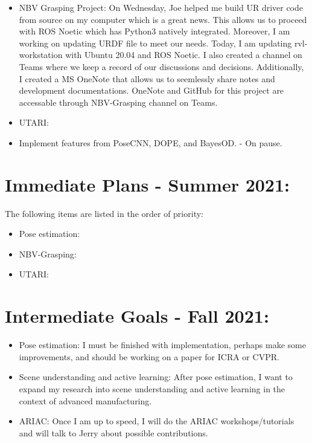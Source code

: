 \documentclass[11pt]{article}
\begin{document}
\begin{itemize}
      \item NBV Grasping Project: On Wednesday, Joe helped me build UR driver
      code from source on my computer which is a great news. This allows us to
      proceed with ROS Noetic which has Python3 natively integrated. Moreover,
      I am working on updating URDF file to meet our needs. Today, I am updating
      rvl-workstation with Ubuntu 20.04 and ROS Noetic. I also created a channel
      on Teams where we keep a record of our discussions and decisions. Additionally,
      I created a MS OneNote that allows us to seemlessly share notes and development
      documentations. OneNote and GitHub for this project are accessable through
      NBV-Grasping channel on Teams.

      \item UTARI:

      \item Implement features from PoseCNN, DOPE, and BayesOD. - On pause.
\end{itemize}


\section{Immediate Plans - Summer 2021:}
The following items are listed in the order of priority:

\begin{itemize}
      \item Pose estimation:
      \item NBV-Grasping:
      \item UTARI:
\end{itemize}

\section{Intermediate Goals - Fall 2021:}
\begin{itemize}
      \item Pose estimation: I must be finished with implementation, perhaps
      make some improvements, and should be working on a paper for ICRA or CVPR.
      \item Scene understanding and active learning: After pose estimation, I
      want to expand my research into scene understanding and active learning in
      the context of advanced manufacturing.
      \item ARIAC: Once I am up to speed, I will do the ARIAC workshops/tutorials
      and will talk to Jerry about possible contributions.
\end{itemize}


\newpage


\end{document}
